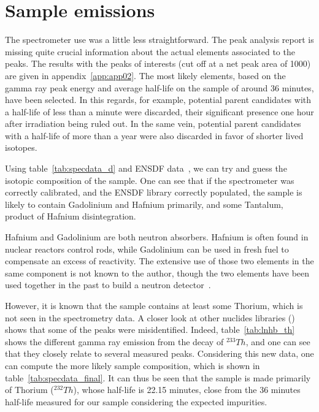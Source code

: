 \section{Sample emissions}

The spectrometer use was a little less straightforward. The peak analysis report is missing quite crucial information about the actual elements associated to the peaks. The results with the peaks of interests (cut off at a net peak area of 1000) are given in appendix~\ref{app:app02}. The most likely elements, based on the gamma ray peak energy and average half-life on the sample of around 36 minutes, have been selected. In this regards, for example, potential parent candidates with a half-life of less than a minute were discarded, their significant presence one hour after irradiation being ruled out. In the same vein, potential parent candidates with a half-life of more than a year were also discarded in favor of shorter lived isotopes.

Using table~\ref{tab:specdata_d} and ENSDF data~\cite{iaea_nds}, we can try and guess the isotopic composition of the sample. One can see that if the spectrometer was correctly calibrated, and the ENSDF library correctly populated, the sample is likely to contain Gadolinium and Hafnium primarily, and some Tantalum, product of Hafnium disintegration.

Hafnium and Gadolinium are both neutron absorbers. Hafnium is often found in nuclear reactors control rods, while Gadolinium can be used in fresh fuel to compensate an excess of reactivity. The extensive use of those two elements in the same component is not known to the author, though the two elements have been used together in the past to build a neutron detector~\cite{imel95}.

However, it is known that the sample contains at least some Thorium, which is not seen in the spectrometry data. A closer look at other nuclides libraries (\cite{lnhb01}) shows that some of the peaks were misidentified. Indeed, table~\ref{tab:lnhb_th} shows the different gamma ray emission from the decay of $^{233}Th$, and one can see that they closely relate to several measured peaks. Considering this new data, one can compute the more likely sample composition, which is shown in table~\ref{tab:specdata_final}. It can thus be seen that the sample is made primarily of Thorium ($^{232}Th$), whose half-life is 22.15 minutes, close from the 36 minutes half-life measured for our sample considering the expected impurities.

